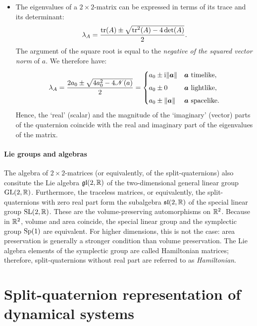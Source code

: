 \begin{itemize}
\begin{table}[h!]
\begin{tabular}{c|ccc}
            \bottomrule
        \end{tabular}
        \end{table}
    \item The eigenvalues of a $2\times2$-matrix can be expressed in terms of its trace and its determinant:
        $$ \lambda_A = \frac{\trace(A) \pm \sqrt{\trace^2(A) - 4\det(A)}}{2}.$$
        The argument of the square root is equal to the \emph{negative of the squared vector norm} of $a$. We therefore have:
        \begin{equation}
            \lambda_A = \frac{2a_0 \pm \sqrt{4 a_0^2 - 4\mathscr{N}(a)}}{2} = 
            \begin{cases}
                a_0 \pm \ii\norm{\vec{a}} & \vec{a} \text{ timelike},\\[1ex]
                a_0 \pm 0  & \vec{a} \text{ lightlike},\\[1ex]
                a_0 \pm \norm{\vec{a}} & \vec{a} \text{ spacelike}.\\
            \end{cases}
            \label{eq:quat_eigvals}
        \end{equation}
        Hence, the `real' (scalar) and the magnitude of the `imaginary' (vector) parts of the quaternion coincide with the real and imaginary part of the eigenvalues of the matrix.
\end{itemize}

\paragraph{Lie groups and algebras} 
The algebra of $2\times2$-matrices (or equivalently, of the split-quaternions) also consitute the Lie algebra $\mathfrak{gl}(2, \mathbb{R})$ of the two-dimensional general linear group $\mathrm{GL}(2, \mathbb{R})$. Furthermore, the traceless matrices, or equivalently, the split-quaternions with zero real part form the subalgebra $\mathfrak{sl}(2, \mathbb{R})$ of the special linear group $\mathrm{SL}(2, \mathbb{R})$. These are the volume-preserving automorphisms on $\mathbb{R}^2$. Because in $\mathbb{R}^2$, volume and area coincide, the special linear group and the symplectic group $\mathrm{Sp}(1)$ are equivalent. For higher dimensions, this is not the case: area preservation is generally a stronger condition than volume preservation. The Lie algebra elements of the symplectic group are called Hamiltonian matrices; therefore, split-quaternions without real part are referred to as \emph{Hamiltonian}.

\section{Split-quaternion representation of dynamical systems}
\label{sec:system_classification}
